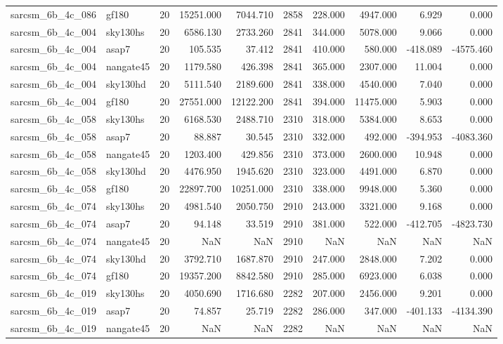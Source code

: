\documentclass{article}
\begin{document}
\begin{longtable}{llrrrrrrrr}
sarcsm\_6b\_4c\_086 & gf180 & 20 & 15251.000 & 7044.710 & 2858 & 228.000 & 4947.000 & 6.929 & 0.000 \\
sarcsm\_6b\_4c\_004 & sky130hs & 20 & 6586.130 & 2733.260 & 2841 & 344.000 & 5078.000 & 9.066 & 0.000 \\
sarcsm\_6b\_4c\_004 & asap7 & 20 & 105.535 & 37.412 & 2841 & 410.000 & 580.000 & -418.089 & -4575.460 \\
sarcsm\_6b\_4c\_004 & nangate45 & 20 & 1179.580 & 426.398 & 2841 & 365.000 & 2307.000 & 11.004 & 0.000 \\
sarcsm\_6b\_4c\_004 & sky130hd & 20 & 5111.540 & 2189.600 & 2841 & 338.000 & 4540.000 & 7.040 & 0.000 \\
sarcsm\_6b\_4c\_004 & gf180 & 20 & 27551.000 & 12122.200 & 2841 & 394.000 & 11475.000 & 5.903 & 0.000 \\
sarcsm\_6b\_4c\_058 & sky130hs & 20 & 6168.530 & 2488.710 & 2310 & 318.000 & 5384.000 & 8.653 & 0.000 \\
sarcsm\_6b\_4c\_058 & asap7 & 20 & 88.887 & 30.545 & 2310 & 332.000 & 492.000 & -394.953 & -4083.360 \\
sarcsm\_6b\_4c\_058 & nangate45 & 20 & 1203.400 & 429.856 & 2310 & 373.000 & 2600.000 & 10.948 & 0.000 \\
sarcsm\_6b\_4c\_058 & sky130hd & 20 & 4476.950 & 1945.620 & 2310 & 323.000 & 4491.000 & 6.870 & 0.000 \\
sarcsm\_6b\_4c\_058 & gf180 & 20 & 22897.700 & 10251.000 & 2310 & 338.000 & 9948.000 & 5.360 & 0.000 \\
sarcsm\_6b\_4c\_074 & sky130hs & 20 & 4981.540 & 2050.750 & 2910 & 243.000 & 3321.000 & 9.168 & 0.000 \\
sarcsm\_6b\_4c\_074 & asap7 & 20 & 94.148 & 33.519 & 2910 & 381.000 & 522.000 & -412.705 & -4823.730 \\
sarcsm\_6b\_4c\_074 & nangate45 & 20 & NaN & NaN & 2910 & NaN & NaN & NaN & NaN \\
sarcsm\_6b\_4c\_074 & sky130hd & 20 & 3792.710 & 1687.870 & 2910 & 247.000 & 2848.000 & 7.202 & 0.000 \\
sarcsm\_6b\_4c\_074 & gf180 & 20 & 19357.200 & 8842.580 & 2910 & 285.000 & 6923.000 & 6.038 & 0.000 \\
sarcsm\_6b\_4c\_019 & sky130hs & 20 & 4050.690 & 1716.680 & 2282 & 207.000 & 2456.000 & 9.201 & 0.000 \\
sarcsm\_6b\_4c\_019 & asap7 & 20 & 74.857 & 25.719 & 2282 & 286.000 & 347.000 & -401.133 & -4134.390 \\
sarcsm\_6b\_4c\_019 & nangate45 & 20 & NaN & NaN & 2282 & NaN & NaN & NaN & NaN \\

\end{longtable}
\end{document}
